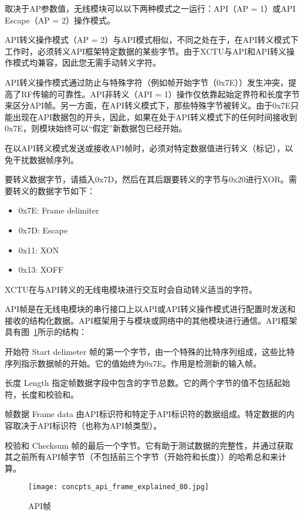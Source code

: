 取决于AP参数值，无线模块可以以下两种模式之一运行：API（AP = 1）或API Escape（AP = 2）操作模式。

API转义操作模式（AP = 2）与API模式相似，不同之处在于，在API转义模式下工作时，必须转义API框架特定数据的某些字节。由于XCTU与API和API转义操作模式均兼容，因此您无需手动转义字符。

API转义操作模式通过防止与特殊字符（例如帧开始字节（0x7E））发生冲突，提高了RF传输的可靠性。API非转义（API = 1）操作仅依靠起始定界符和长度字节来区分API帧。另一方面，在API转义模式下，那些特殊字节被转义。由于0x7E只能出现在API数据包的开头，因此，如果在处于API转义模式下的任何时间接收到0x7E，则模块始终可以“假定”新数据包已经开始。

在以API转义模式发送或接收API帧时，必须对特定数据值进行转义（标记），以免干扰数据帧序列。

要转义数据字节，请插入0x7D，然后在其后跟要转义的字节与0x20进行XOR。需要转义的数据字节如下：

\begin{itemize}
    \item 0x7E: Frame delimiter
    \item 0x7D: Escape
    \item 0x11: XON
    \item 0x13: XOFF    
\end{itemize}

XCTU在与API转义的无线电模块进行交互时会自动转义适当的字符。

API帧是在无线电模块的串行接口上​​以API或API转义操作模式进行配置时发送和接收的结构化数据。API框架用于与模块或网络中的其他模块进行通信。API框架具有图~\ref{fig:api-frame}所示的结构：

开始符 Start delimeter 帧的第一个字节，由一个特殊的比特序列组成，这些比特序列指示数据帧的开始。它的值始终为0x7E。作用是检测新的输入帧。

长度 Length 指定帧数据字段中包含的字节总数。它的两个字节的值不包括起始符，长度和校验和。

帧数据 Frame data 由API标识符和特定于API标识符的数据组成。特定数据的内容取决于API标识符（也称为API帧类型）。

校验和 Checksum 帧的最后一个字节。它有助于测试数据的完整性，并通过获取其之前所有API帧字节（不包括前三个字节（开始符和长度））的哈希总和来计算。

\begin{figure}[htbp]
    \centering
    \texttt{[image: concpts\_api\_frame\_explained\_80.jpg]}
    \caption{API帧}
    \label{fig:api-frame}
\end{figure}


